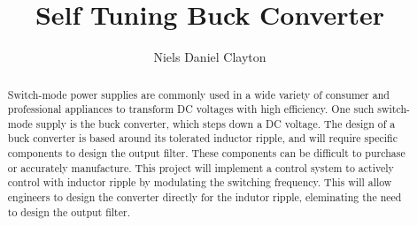 \documentclass[11pt, a4paper, oneside]{report}
\title{Self Tuning Buck Converter}
\author{Niels Daniel Clayton}
\date{}
\begin{document}
\frontmatter


\begin{abstract}

	Switch-mode power supplies are commonly used in a wide variety of consumer and professional appliances to transform DC voltages with high efficiency. One such switch-mode supply is the buck converter, which steps down a DC voltage. The design of a buck converter is based around its tolerated inductor ripple, and will require specific components to design the output filter. These components can be difficult to purchase or accurately manufacture. This project will implement a control system to actively control with inductor ripple by modulating the switching frequency. This will allow engineers to design the converter directly for the indutor ripple, eleminating the need to design the output filter.

\end{abstract}


\maketitle

% 

\tableofcontents


\mainmatter










\backmatter



%


\end{document}
